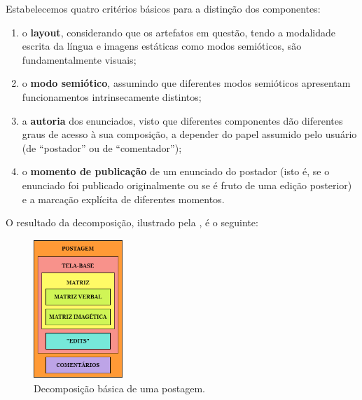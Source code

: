 \documentclass{textolivre-html}
\begin{document}
Estabelecemos quatro critérios básicos para a distinção dos componentes:
\begin{enumerate}[label=\roman*.,ref=\roman*]
\item \label{itm01} o \textbf{layout}, considerando que os artefatos em questão, tendo a modalidade escrita da língua e imagens estáticas como modos semióticos, são fundamentalmente visuais;
\item \label{itm02} o \textbf{modo semiótico}, assumindo que diferentes modos semióticos apresentam funcionamentos intrinsecamente distintos;
\item \label{itm03} a \textbf{autoria} dos enunciados, visto que diferentes componentes dão diferentes graus de acesso à sua composição, a depender do papel assumido pelo usuário (de “postador” ou de “comentador”);
\item \label{itm04} o \textbf{momento de publicação} de um enunciado do postador (isto é, se o enunciado foi publicado originalmente ou se é fruto de uma edição posterior) e a marcação explícita de diferentes momentos.
\end{enumerate}

O resultado da decomposição, ilustrado pela , é o seguinte:

\begin{figure}[htbp]
 \centering
 \includegraphics[width=0.3\textwidth]{fig02}
 \caption{Decomposição básica de uma postagem.}
 \label{fig02}
\end{figure}
\end{document}
